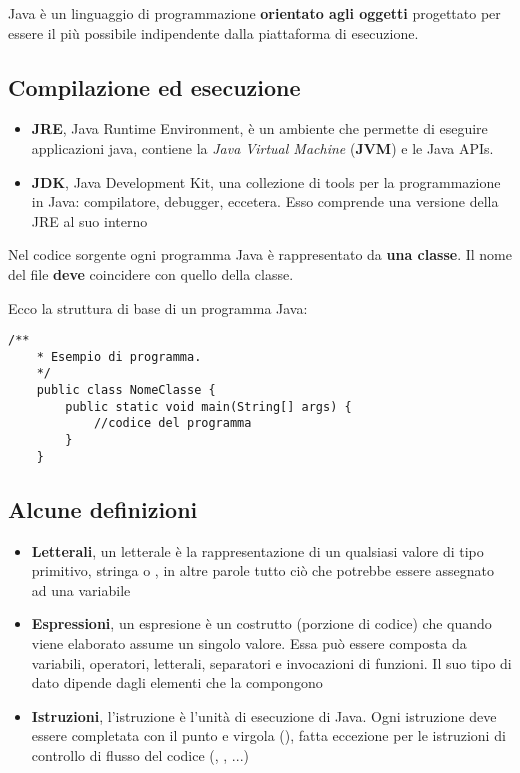 \documentclass[../main.tex]{subfiles}
\begin{document}
Java è un linguaggio di programmazione \textbf{orientato agli oggetti} progettato per essere il più possibile indipendente dalla
piattaforma di esecuzione.

\subsection{Compilazione ed esecuzione}
\begin{itemize}
    \item \textbf{JRE}, Java Runtime Environment, è un ambiente che permette di eseguire applicazioni java, contiene la
    \textit{Java Virtual Machine} (\textbf{JVM}) e le Java APIs.
    \item \textbf{JDK}, Java Development Kit, una collezione di tools per la programmazione in Java: compilatore, debugger, eccetera.
    Esso comprende una versione della JRE al suo interno
\end{itemize}


Nel codice sorgente ogni programma Java è rappresentato da \textbf{una classe}. Il nome del file \textbf{deve} coincidere con quello
della classe.

Ecco la struttura di base di un programma Java:
\begin{lstlisting}[style=java]
    /**
    * Esempio di programma.
    */
    public class NomeClasse {
        public static void main(String[] args) {
            //codice del programma
        }
    }
\end{lstlisting}

\subsection{Alcune definizioni}
\begin{itemize}
    \item \textbf{Letterali}, un letterale è la rappresentazione di un qualsiasi valore di tipo primitivo, stringa o , in altre
    parole tutto ciò che potrebbe essere assegnato ad una variabile
    \item \textbf{Espressioni}, un espresione è un costrutto (porzione di codice) che quando viene elaborato assume un singolo valore.
    Essa può essere composta da variabili, operatori, letterali, separatori e invocazioni di funzioni. Il suo tipo di dato dipende dagli
    elementi che la compongono
    \item \textbf{Istruzioni}, l'istruzione è l'unità di esecuzione di Java. Ogni istruzione deve essere completata con il punto e virgola
    (\code{;}), fatta eccezione per le istruzioni di controllo di flusso del codice (, , ...)
\end{itemize}
\end{document}
